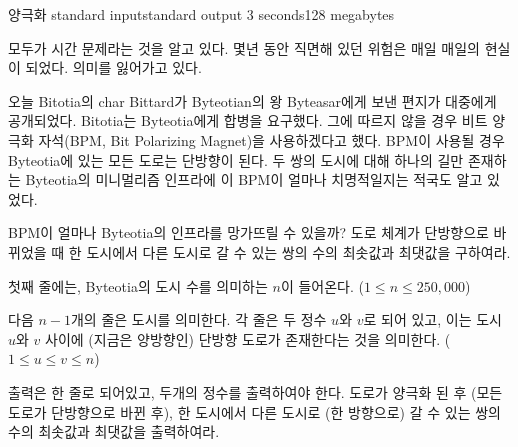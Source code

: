 \begin{problem}{양극화}
	{standard input}{standard output}
	{3 seconds}{128 megabytes}{}
	
	모두가 시간 문제라는 것을 알고 있다. 몇년 동안 직면해 있던 위험은 매일 매일의 현실이 되었다. 의미를 잃어가고 있다.
	
	오늘 Bitotia의 char Bittard가 Byteotian의 왕 Byteasar에게 보낸 편지가 대중에게 공개되었다. Bitotia는 Byteotia에게 합병을 요구했다. 그에 따르지 않을 경우 비트 양극화 자석(BPM, Bit Polarizing Magnet)을 사용하겠다고 했다. BPM이 사용될 경우 Byteotia에 있는 모든 도로는 단방향이 된다. 두 쌍의 도시에 대해 하나의 길만 존재하는 Byteotia의 미니멀리즘 인프라에 이 BPM이 얼마나 치명적일지는 적국도 알고 있었다. 
	
	BPM이 얼마나 Byteotia의 인프라를 망가뜨릴 수 있을까? 도로 체계가 단방향으로 바뀌었을 때 한 도시에서 다른 도시로 갈 수 있는 쌍의 수의 최솟값과 최댓값을 구하여라.
	
	\InputFile
	
	첫째 줄에는, Byteotia의 도시 수를 의미하는 $n$이 들어온다. ($1 \le n \le 250, 000$)
	
	다음 $n-1$개의 줄은 도시를 의미한다. 각 줄은 두 정수 $u$와 $v$로 되어 있고, 이는 도시 $u$와 $v$ 사이에 (지금은 양방향인) 단방향 도로가 존재한다는 것을 의미한다. ($1 \le u \le v \le n$)
	
	\OutputFile
	
	출력은 한 줄로 되어있고, 두개의 정수를 출력하여야 한다. 도로가 양극화 된 후 (모든 도로가 단방향으로 바뀐 후), 한 도시에서 다른 도시로 (한 방향으로) 갈 수 있는 쌍의 수의 최솟값과 최댓값을 출력하여라.
	 
	\Examples
		
	\begin{example}
	\end{example}
    
\end{problem}

